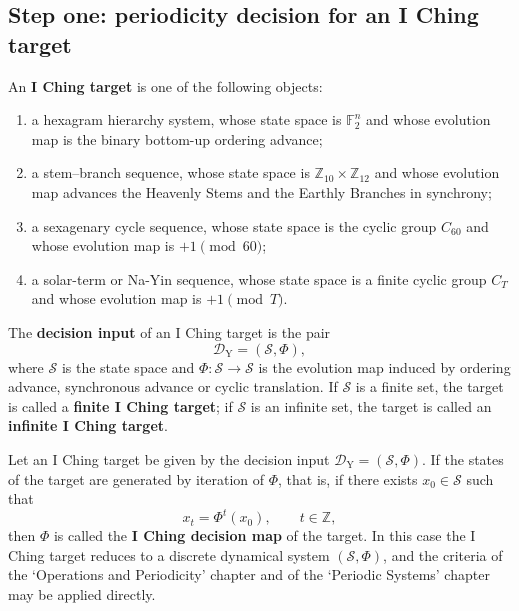 \subsection{Step one: periodicity decision for an I Ching target}

\begin{definition}\label{def:yijing_target}
An \textbf{I Ching target} is one of the following objects:
\begin{enumerate}[label=(\roman*)]
    \item a hexagram hierarchy system, whose state space is $\mathbb F_2^n$ and whose evolution map is the binary bottom-up ordering advance;
    \item a stem--branch sequence, whose state space is $\mathbb Z_{10}\times \mathbb Z_{12}$ and whose evolution map advances the Heavenly Stems and the Earthly Branches in synchrony;
    \item a sexagenary cycle sequence, whose state space is the cyclic group $C_{60}$ and whose evolution map is $+1\pmod{60}$;
    \item a solar-term or Na-Yin sequence, whose state space is a finite cyclic group $C_T$ and whose evolution map is $+1\pmod T$.
\end{enumerate}
The \textbf{decision input} of an I Ching target is the pair
\[
\mathcal D_{\mathrm{Y}}=(\mathcal S,\Phi),
\]
where $\mathcal S$ is the state space and $\Phi:\mathcal S\to\mathcal S$ is the evolution map induced by ordering advance, synchronous advance or cyclic translation. If $\mathcal S$ is a finite set, the target is called a \textbf{finite I Ching target}; if $\mathcal S$ is an infinite set, the target is called an \textbf{infinite I Ching target}.
\end{definition}

\begin{definition}\label{def:yijing_periodization}
Let an I Ching target be given by the decision input $\mathcal D_{\mathrm{Y}}=(\mathcal S,\Phi)$. If the states of the target are generated by iteration of $\Phi$, that is, if there exists $x_0\in\mathcal S$ such that
\[
x_t=\Phi^t(x_0),\qquad t\in\mathbb Z,
\]
then $\Phi$ is called the \textbf{I Ching decision map} of the target. In this case the I Ching target reduces to a discrete dynamical system $(\mathcal S,\Phi)$, and the criteria of the `Operations and Periodicity' chapter and of the `Periodic Systems' chapter may be applied directly.
\end{definition}

